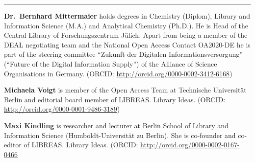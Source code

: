 \begin{center}\rule{0.5\linewidth}{\linethickness}\end{center}

\textbf{Dr.~Bernhard Mittermaier} holds degrees in Chemistry (Diplom),
Library and Information Science (M.A.) and Analytical Chemistry (Ph.D.).
He is Head of the Central Library of Forschungszentrum Jülich. Apart
from being a member of the DEAL negotiating team and the National Open
Access Contact OA2020-DE he is part of the steering committee ``Zukunft
der Digitalen Informationsversorgung'' (``Future of the Digital
Information Supply'') of the Alliance of Science Organisations in
Germany. (ORCID: \url{http://orcid.org/0000-0002-3412-6168})

\textbf{Michaela Voigt} is member of the Open Access Team at Technische
Universität Berlin and editorial board member of LIBREAS. Library Ideas.
(ORCID: \url{http://orcid.org/0000-0001-9486-3189})

\textbf{Maxi Kindling} is researcher and lecturer at Berlin School of
Library and Information Science (Humboldt-Universität zu Berlin). She is
co-founder and co-editor of LIBREAS. Library Ideas. (ORCID:
\url{http://orcid.org/0000-0002-0167-0466}
